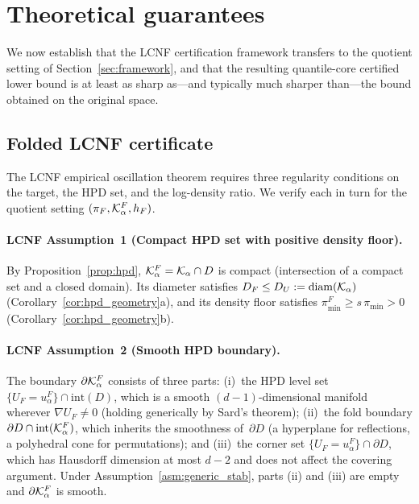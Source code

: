 %  

\section{Theoretical guarantees}
\label{sec:theory}

We now establish that the LCNF certification framework
\citep{LCNF} transfers to the quotient setting of
Section~\ref{sec:framework}, and that the resulting
quantile-core certified lower bound is at least as sharp
as---and typically much sharper than---the bound obtained on
the original space.


\subsection{Folded LCNF certificate}
\label{sec:folded_cert}

The LCNF empirical oscillation theorem \citep[Theorem~5.1]{LCNF}
requires three regularity conditions on the target, the HPD set,
and the log-density ratio.  We verify each in turn for the quotient
setting $(\pi_F, \mathcal{K}_\alpha^F, h_F)$.

\paragraph{LCNF Assumption~1 (Compact HPD set with positive density floor).}
By Proposition~\ref{prop:hpd}, $\mathcal{K}_\alpha^F = \mathcal{K}_\alpha \cap D$ is
compact (intersection of a compact set and a closed domain).
Its diameter satisfies $D_F \leq D_U := \mathrm{diam}(\mathcal{K}_\alpha)$
(Corollary~\ref{cor:hpd_geometry}a), and its density floor satisfies
$\pi_{\min}^F \geq s\,\pi_{\min} > 0$
(Corollary~\ref{cor:hpd_geometry}b).

\paragraph{LCNF Assumption~2 (Smooth HPD boundary).}
The boundary $\partial\mathcal{K}_\alpha^F$ consists of three parts:
(i)~the HPD level set $\{U_F = u_\alpha^F\} \cap \mathrm{int}(D)$,
which is a smooth $(d{-}1)$-dimensional manifold wherever
$\nabla U_F \neq 0$ (holding generically by Sard's theorem);
(ii)~the fold boundary $\partial D \cap \mathrm{int}(\mathcal{K}_\alpha^F)$,
which inherits the smoothness of~$\partial D$ (a hyperplane for
reflections, a polyhedral cone for permutations); and
(iii)~the corner set $\{U_F = u_\alpha^F\} \cap \partial D$,
which has Hausdorff dimension at most $d{-}2$ and does not affect
the covering argument.
Under Assumption~\ref{asm:generic_stab}, parts (ii) and (iii)
are empty and $\partial\mathcal{K}_\alpha^F$ is smooth.

